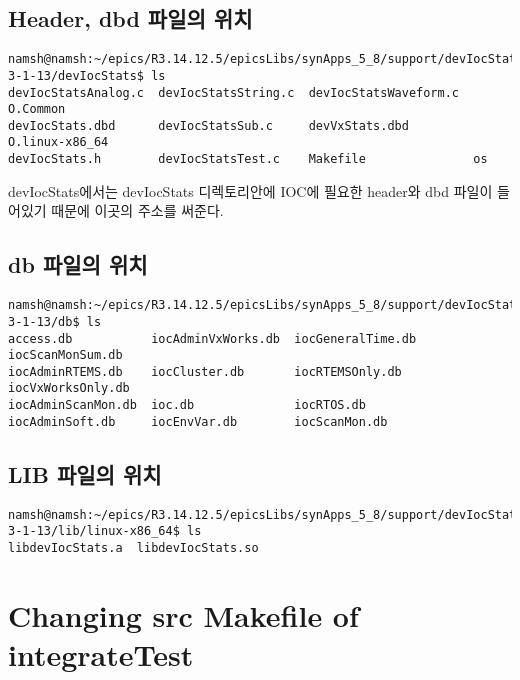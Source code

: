 \documentclass[11pt
  , a4paper
  , article
  , oneside
]{memoir}
\begin{document}
\subsection{Header, dbd 파일의 위치}
\begin{lstlisting}[style=termstyle]
namsh@namsh:~/epics/R3.14.12.5/epicsLibs/synApps_5_8/support/devIocStats-3-1-13/devIocStats$ ls
devIocStatsAnalog.c  devIocStatsString.c  devIocStatsWaveform.c  O.Common
devIocStats.dbd      devIocStatsSub.c     devVxStats.dbd         O.linux-x86_64
devIocStats.h        devIocStatsTest.c    Makefile               os
\end{lstlisting}
devIocStats에서는 devIocStats 디렉토리안에 IOC에 필요한 header와 dbd 파일이 들어있기 때문에 이곳의 주소를 써준다.
\subsection{db 파일의 위치}
\begin{lstlisting}[style=termstyle]
namsh@namsh:~/epics/R3.14.12.5/epicsLibs/synApps_5_8/support/devIocStats-3-1-13/db$ ls
access.db           iocAdminVxWorks.db  iocGeneralTime.db  iocScanMonSum.db
iocAdminRTEMS.db    iocCluster.db       iocRTEMSOnly.db    iocVxWorksOnly.db
iocAdminScanMon.db  ioc.db              iocRTOS.db
iocAdminSoft.db     iocEnvVar.db        iocScanMon.db
\end{lstlisting}
\subsection{LIB 파일의 위치}
\begin{lstlisting}[style=termstyle]
namsh@namsh:~/epics/R3.14.12.5/epicsLibs/synApps_5_8/support/devIocStats-3-1-13/lib/linux-x86_64$ ls
libdevIocStats.a  libdevIocStats.so
\end{lstlisting}
\section{Changing src Makefile of integrateTest}
\end{document}
